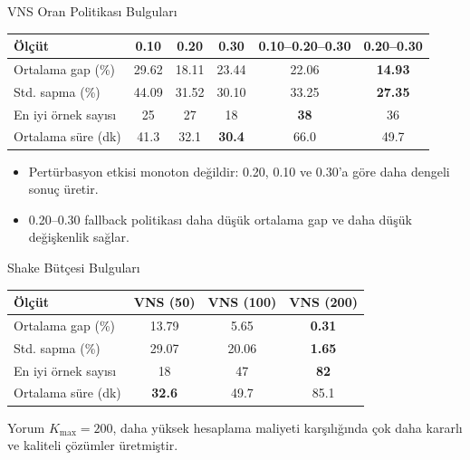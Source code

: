 \documentclass[aspectratio=169,11pt]{beamer}
\begin{document}
\begin{frame}{VNS Oran Politikası Bulguları}
  \begin{table}
    \centering
    \scriptsize
    \begin{tabular}{lccccc}
      \toprule
      \textbf{Ölçüt} & \textbf{0.10} & \textbf{0.20} & \textbf{0.30} & \textbf{0.10--0.20--0.30} & \textbf{0.20--0.30} \\
      \midrule
      Ortalama gap (\%) & 29.62 & 18.11 & 23.44 & 22.06 & \textbf{14.93} \\
      Std. sapma (\%) & 44.09 & 31.52 & 30.10 & 33.25 & \textbf{27.35} \\
      En iyi örnek sayısı & 25 & 27 & 18 & \textbf{38} & 36 \\
      Ortalama süre (dk) & 41.3 & 32.1 & \textbf{30.4} & 66.0 & 49.7 \\
      \bottomrule
    \end{tabular}
  \end{table}

  \begin{itemize}
    \item Pertürbasyon etkisi monoton değildir: 0.20, 0.10 ve 0.30'a göre daha dengeli sonuç üretir.
    \item 0.20--0.30 fallback politikası daha düşük ortalama gap ve daha düşük değişkenlik sağlar.
  \end{itemize}
\end{frame}

\begin{frame}{Shake Bütçesi Bulguları}
  \begin{table}
    \centering
    \small
    \begin{tabular}{lccc}
      \toprule
      \textbf{Ölçüt} & \textbf{VNS (50)} & \textbf{VNS (100)} & \textbf{VNS (200)} \\
      \midrule
      Ortalama gap (\%) & 13.79 & 5.65 & \textbf{0.31} \\
      Std. sapma (\%) & 29.07 & 20.06 & \textbf{1.65} \\
      En iyi örnek sayısı & 18 & 47 & \textbf{82} \\
      Ortalama süre (dk) & \textbf{32.6} & 49.7 & 85.1 \\
      \bottomrule
    \end{tabular}
  \end{table}

  \begin{alertblock}{Yorum}
    $K_{\max}=200$, daha yüksek hesaplama maliyeti karşılığında çok daha kararlı ve kaliteli çözümler üretmiştir.
  \end{alertblock}
\end{frame}
\end{document}
